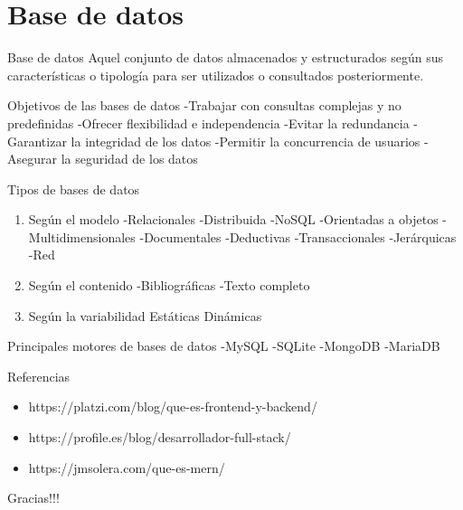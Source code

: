 \documentclass[11pt]{beamer}
\begin{document}
\section{Base de datos}
\begin{frame}{Base de datos}
	Aquel conjunto de datos almacenados y estructurados según sus características o tipología para ser utilizados o consultados posteriormente.
	
	
	\begin{alertblock}{Objetivos de las bases de datos}
		-Trabajar con consultas complejas y no predefinidas
		-Ofrecer flexibilidad e independencia
		-Evitar la redundancia
		-Garantizar la integridad de los datos
		-Permitir la concurrencia de usuarios
		-Asegurar la seguridad de los datos
	\end{alertblock}
	
	
\end{frame}

\begin{frame}
	\begin{block}{Tipos de bases de datos}
	\begin{enumerate}
		\item Según el modelo
		-Relacionales
		-Distribuida
		-NoSQL
		-Orientadas a objetos
		-Multidimensionales
		-Documentales
		-Deductivas
		-Transaccionales
		-Jerárquicas
		-Red
		\item 		Según el contenido
		-Bibliográficas
		-Texto completo
		\item 	Según la variabilidad
		Estáticas
		Dinámicas
	\end{enumerate}
\end{block}

	\begin{block}{Principales motores de bases de datos}
		-MySQL
		-SQLite
		-MongoDB
		-MariaDB
	\end{block}
\end{frame}

\begin{frame}{Referencias}
	\begin{itemize}
		\item https://platzi.com/blog/que-es-frontend-y-backend/
		\item https://profile.es/blog/desarrollador-full-stack/
		\item https://jmsolera.com/que-es-mern/
	\end{itemize}
\end{frame}


\begin{frame}
	\huge Gracias!!!
\end{frame}
\end{document}
